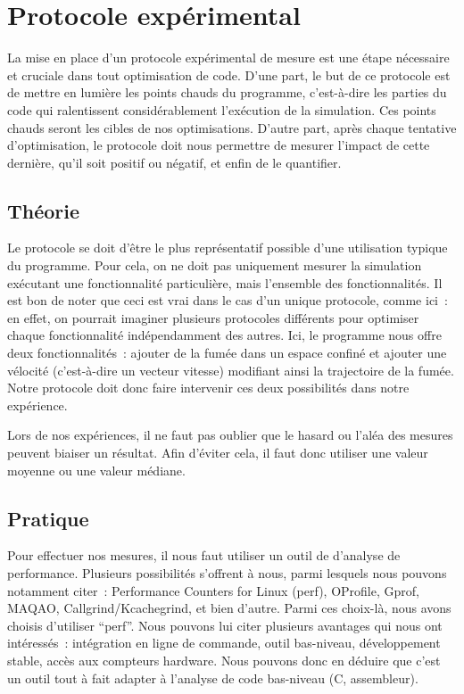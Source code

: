 \documentclass[12pt,a4paper]{article}
\begin{document}
\section{Protocole expérimental}
\label{sec.prot}

La mise en place d’un protocole expérimental de mesure est une étape nécessaire
et cruciale dans tout optimisation de code. D’une part, le but de ce protocole
est de mettre en lumière les points chauds du programme, c’est-à-dire les
parties du code qui ralentissent considérablement l’exécution de la simulation.
Ces points chauds seront les cibles de nos optimisations. D’autre part, après
chaque tentative d’optimisation, le protocole doit nous permettre de mesurer
l’impact de cette dernière, qu’il soit positif ou négatif, et enfin de le
quantifier.

\subsection{Théorie}
\label{sub.prot.theo}

Le protocole se doit d’être le plus représentatif possible d’une utilisation
typique du programme. Pour cela, on ne doit pas uniquement mesurer la simulation
exécutant une fonctionnalité particulière, mais l’ensemble des fonctionnalités.
Il est bon de noter que ceci est vrai dans le cas d’un unique protocole, comme
ici : en effet, on pourrait imaginer plusieurs protocoles différents pour
optimiser chaque fonctionnalité indépendamment des autres. Ici, le programme
nous offre deux fonctionnalités : ajouter de la fumée dans un espace confiné et
ajouter une vélocité (c’est-à-dire un vecteur vitesse) modifiant ainsi la
trajectoire de la fumée. Notre protocole doit donc faire intervenir ces deux
possibilités dans notre expérience.

Lors de nos expériences, il ne faut pas oublier que le hasard ou l’aléa des
mesures peuvent biaiser un résultat. Afin d’éviter cela, il faut donc utiliser
une valeur moyenne ou une valeur médiane.

\subsection{Pratique}
\label{sub.prot.pract}

Pour effectuer nos mesures, il nous faut utiliser un outil de d’analyse de
performance. Plusieurs possibilités s’offrent à nous, parmi lesquels nous
pouvons notamment citer : Performance Counters for Linux (perf), OProfile,
Gprof, MAQAO, Callgrind/Kcachegrind, et bien d’autre. Parmi ces choix-là, nous
avons choisis d’utiliser \enquote{perf}. Nous pouvons lui citer plusieurs
avantages qui nous ont intéressés : intégration en ligne de commande, outil
bas-niveau, développement stable, accès aux compteurs hardware. Nous pouvons
donc en déduire que c’est un outil tout à fait adapter à l’analyse de code
bas-niveau (C, assembleur).
\end{document}
